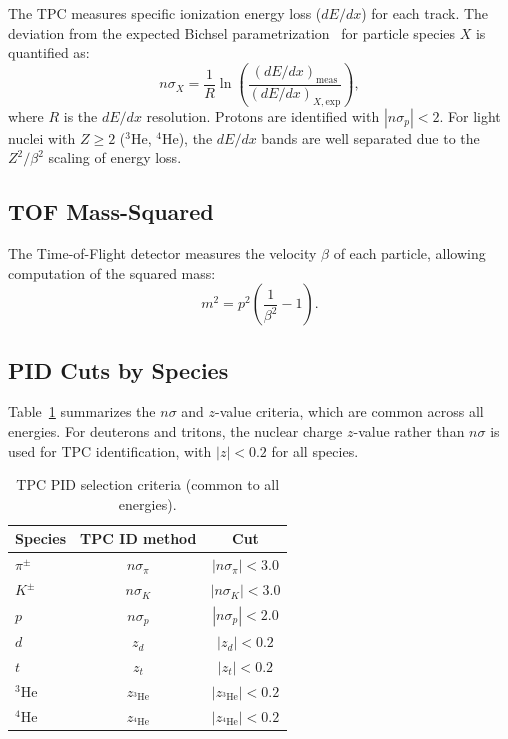 \documentclass[aps,prc,preprint,superscriptaddress,nofootinbib]{revtex4-2}
\begin{document}
The TPC measures specific ionization energy loss ($dE/dx$) for each track. The deviation from the expected Bichsel parametrization~\cite{Bichsel:2006cs} for particle species $X$ is quantified as:
\begin{equation}
    n\sigma_X = \frac{1}{R} \ln\left(\frac{(dE/dx)_{\text{meas}}}{(dE/dx)_{X,\text{exp}}}\right),
    \label{eq:nsigma}
\end{equation}
where $R$ is the $dE/dx$ resolution. Protons are identified with $|n\sigma_p| < 2$. For light nuclei with $Z \geq 2$ ($^3$He, $^4$He), the $dE/dx$ bands are well separated due to the $Z^2/\beta^2$ scaling of energy loss.

\subsection{TOF Mass-Squared}
\label{subsec:m2}

The Time-of-Flight detector measures the velocity $\beta$ of each particle, allowing computation of the squared mass:
\begin{equation}
    m^2 = p^2\left(\frac{1}{\beta^2} - 1\right).
    \label{eq:m2}
\end{equation}

\subsection{PID Cuts by Species}
\label{subsec:pid_cuts}

Table~\ref{tab:pid_nsigma} summarizes the $n\sigma$ and $z$-value criteria, which are common across all energies. For deuterons and tritons, the nuclear charge $z$-value rather than $n\sigma$ is used for TPC identification, with $|z| < 0.2$ for all species.

\begin{table}[h]
\centering
\caption{TPC PID selection criteria (common to all energies).}
\label{tab:pid_nsigma}
\begin{tabular}{lcc}
\toprule
Species & TPC ID method & Cut \\
\midrule
$\pi^{\pm}$  & $n\sigma_\pi$  & $|n\sigma_\pi| < 3.0$ \\
$K^{\pm}$    & $n\sigma_K$    & $|n\sigma_K| < 3.0$ \\
$p$          & $n\sigma_p$    & $|n\sigma_p| < 2.0$ \\
$d$          & $z_d$          & $|z_d| < 0.2$ \\
$t$          & $z_t$          & $|z_t| < 0.2$ \\
$^3$He       & $z_{^3\text{He}}$ & $|z_{^3\text{He}}| < 0.2$ \\
$^4$He       & $z_{^4\text{He}}$ & $|z_{^4\text{He}}| < 0.2$ \\
\bottomrule
\end{tabular}
\end{table}
\end{document}
